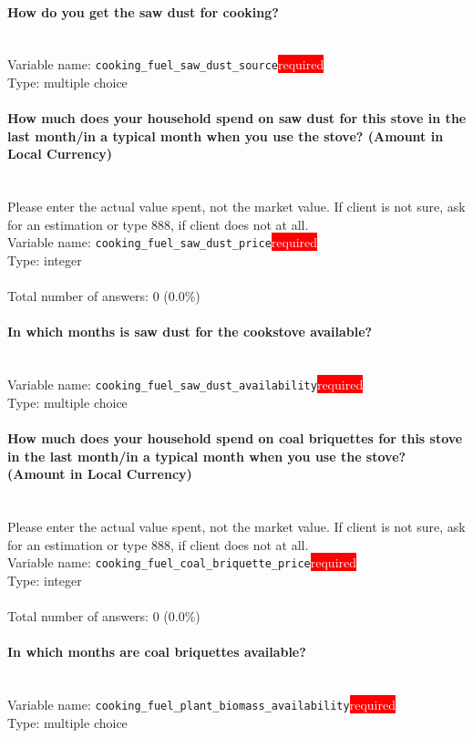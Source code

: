 \documentclass[11.5pt, a4paper]{scrartcl}
\begin{document}
\paragraph{How do you get the saw dust for cooking?}
\  \\Variable name: \texttt{cooking\_fuel\_saw\_dust\_source}\hfill\colorbox{red}{\small{\textcolor{white}{required}}}\\
 Type: multiple choice\\
\paragraph{How much  does your household spend on saw dust for this stove in the last month/in a typical month when you use the stove? (Amount in Local Currency) }
\ \\ {\small Please enter the actual value spent, not the market value. If client is not sure, ask for an estimation or type 888, if client does not at all. }
\  \\Variable name: \texttt{cooking\_fuel\_saw\_dust\_price}\hfill\colorbox{red}{\small{\textcolor{white}{required}}}\\
 Type: integer\\
\\Total number of answers: 0 (0.0\%)
\\[0.2em]\paragraph{In which months is saw dust for the cookstove available?}
\  \\Variable name: \texttt{cooking\_fuel\_saw\_dust\_availability}\hfill\colorbox{red}{\small{\textcolor{white}{required}}}\\
 Type: multiple choice\\
\paragraph{How much  does your household spend on coal briquettes for this stove in the last month/in a typical month when you use the stove? (Amount in Local Currency) }
\ \\ {\small Please enter the actual value spent, not the market value. If client is not sure, ask for an estimation or type 888, if client does not at all. }
\  \\Variable name: \texttt{cooking\_fuel\_coal\_briquette\_price}\hfill\colorbox{red}{\small{\textcolor{white}{required}}}\\
 Type: integer\\
\\Total number of answers: 0 (0.0\%)
\\[0.2em]\paragraph{In which months are coal briquettes available?}
\  \\Variable name: \texttt{cooking\_fuel\_plant\_biomass\_availability}\hfill\colorbox{red}{\small{\textcolor{white}{required}}}\\
 Type: multiple choice\\
\end{document}
